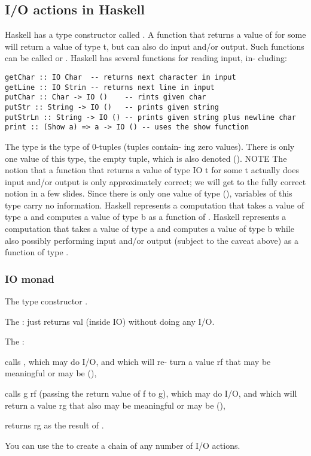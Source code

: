 \subsection{I/O actions in Haskell}
Haskell has a type constructor called . A function that returns a value of  for some 
will return a value of type t, but can also do input
and/or output. Such functions can be called  or .
Haskell has several functions for reading input, in-
cluding:
\begin{lstlisting}
getChar :: IO Char  -- returns next character in input
getLine :: IO Strin -- returns next line in input
putChar :: Char -> IO ()    -- rints given char
putStr :: String -> IO ()   -- prints given string
putStrLn :: String -> IO () -- prints given string plus newline char
print :: (Show a) => a -> IO () -- uses the show function
\end{lstlisting}
The type \e{()} is the type of 0-tuples (tuples contain-
ing zero values). There is only one value of this
type, the empty tuple, which is also denoted ().
NOTE The notion that a function that returns a
value of type IO t for some t actually does input
and/or output is only approximately correct; we
will get to the fully correct notion in a few slides.
Since there is only one value of type (), variables
of this type carry no information.
Haskell represents a computation that takes a value
of type a and computes a value of type b as a function of .
Haskell represents a computation that takes a value
of type a and computes a value of type b while also
possibly performing input and/or output (subject
to the caveat above) as a function of type .

\subsubsection{IO monad}
The type constructor .
\begin{compactitem}
\item The :  just returns
val (inside IO) without doing any I/O.
\item The : 
\begin{compactitem}
\item calls , which may do I/O, and which will re-
turn a value rf that may be meaningful or may
be (),
\item calls g rf (passing the return value of f to g),
which may do I/O, and which will return a
value rg that also may be meaningful or may
be (),
\item returns rg as the result of .\end{compactitem}
You can use the  to create a
chain of any number of I/O actions.
\end{compactitem}

